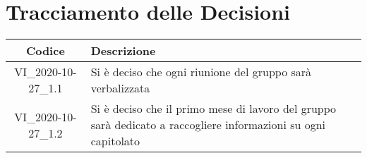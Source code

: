\section*{Tracciamento delle Decisioni}

\begin{center}
	\begin{longtable}{|c|p{13cm}|}
	\hline
	\rowcolor{lighter-grayer}
	\textbf{Codice} & \textbf{Descrizione} \\
	\hline
	\endfirsthead

	\hline
	VI\_2020-10-27\_1.1 & Si è deciso che ogni riunione del gruppo sarà verbalizzata  \\
	\hline
	VI\_2020-10-27\_1.2 & Si è deciso che il primo mese di lavoro del gruppo sarà dedicato a raccogliere informazioni su ogni capitolato  \\
	\hline

	\end{longtable}
\end{center}